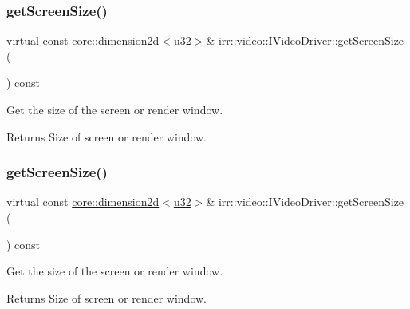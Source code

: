\subsubsection{\texorpdfstring{get\+Screen\+Size()}{getScreenSize()}\hspace{0.1cm}{\footnotesize\ttfamily [1/2]}}
{\footnotesize\ttfamily virtual const \hyperlink{classirr_1_1core_1_1dimension2d}{core\+::dimension2d}$<$\hyperlink{namespaceirr_a0416a53257075833e7002efd0a18e804}{u32}$>$\& irr\+::video\+::\+I\+Video\+Driver\+::get\+Screen\+Size (\begin{DoxyParamCaption}{ }\end{DoxyParamCaption}) const\hspace{0.3cm}{\ttfamily [pure virtual]}}



Get the size of the screen or render window. 

\begin{DoxyReturn}{Returns}
Size of screen or render window. 
\end{DoxyReturn}
\mbox{\label{classirr_1_1video_1_1IVideoDriver_aa106dd9ff233497f9ea9a07dc6441c82}} 
\subsubsection{\texorpdfstring{get\+Screen\+Size()}{getScreenSize()}\hspace{0.1cm}{\footnotesize\ttfamily [2/2]}}
{\footnotesize\ttfamily virtual const \hyperlink{classirr_1_1core_1_1dimension2d}{core\+::dimension2d}$<$\hyperlink{namespaceirr_a0416a53257075833e7002efd0a18e804}{u32}$>$\& irr\+::video\+::\+I\+Video\+Driver\+::get\+Screen\+Size (\begin{DoxyParamCaption}{ }\end{DoxyParamCaption}) const\hspace{0.3cm}{\ttfamily [pure virtual]}}



Get the size of the screen or render window. 

\begin{DoxyReturn}{Returns}
Size of screen or render window. 
\end{DoxyReturn}
\mbox{\label{classirr_1_1video_1_1IVideoDriver_af4055165190e4adf221c6dc6f2434ea0}} 
